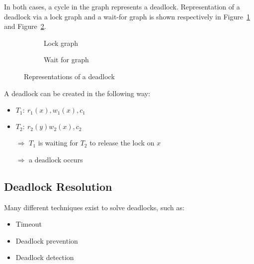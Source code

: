 \documentclass[english]{article}
\begin{document}
In both cases, a cycle in the graph represents a deadlock.
Representation of a deadlock via a lock graph and a wait-for graph is shown respectively in Figure~\ref{subfig:lock-graph} and Figure~\ref{subfig:wait-for-graph}.

\begin{figure}[htbp]
  \centering
  \bigskip
  \begin{subfigure}[b]{0.495\textwidth}
    \centering
    \caption{Lock graph}
    \label{subfig:lock-graph}
  \end{subfigure}
  \bigskip
  \begin{subfigure}[b]{0.495\textwidth}
    \centering
    \caption{Wait for graph}
    \label{subfig:wait-for-graph}
  \end{subfigure}
  \bigskip
  \caption{Representations of a deadlock}
  \label{fig:deadlock-representations}
\end{figure}

\bigskip
A deadlock can be created in the following way:

\begin{minipage}{0.496\textwidth}
  \bigskip
  \begin{itemize}
    \item \(T_1: \ r_1(x), w_1(x), c_1\)
    \item \(T_2: \ r_2(y) w_2(x), c_2\)
    \item[\(\Rightarrow\)] \(T_1\) is waiting for \(T_2\) to release the lock on \(x\)
    \item[\(\Rightarrow\)] a deadlock occurs
  \end{itemize}
\end{minipage}
\begin{minipage}{0.496\textwidth}
  \centering
\end{minipage}

\subsection{Deadlock Resolution}

Many different techniques exist to solve deadlocks, such as:

\begin{itemize}
  \item Timeout
  \item Deadlock prevention
  \item Deadlock detection
\end{itemize}
\end{document}
